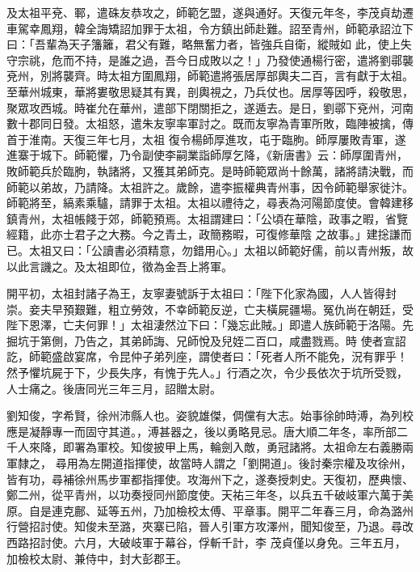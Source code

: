 \begin{pinyinscope}
 及太祖平兗、鄆，遣硃友恭攻之，師範乞盟，遂與通好。天復元年冬，李茂貞劫遷車駕幸鳳翔，韓全誨矯詔加罪于太祖，令方鎮出師赴難。詔至青州，師範承詔泣下曰：「吾輩為天子籓籬，君父有難，略無奮力者，皆強兵自衛，縱賊如
 此，使上失守宗祧，危而不持，是誰之過，吾今日成敗以之！」乃發使通楊行密，遣將劉鄩襲兗州，別將襲齊。時太祖方圍鳳翔，師範遣將張居厚部輿夫二百，言有獻于太祖。至華州城東，華將婁敬思疑其有異，剖輿視之，乃兵仗也。居厚等因呼，殺敬思，聚眾攻西城。時崔允在華州，遣部下閉關拒之，遂遁去。是日，劉鄩下兗州，河南數十郡同日發。太祖怒，遣朱友寧率軍討之。既而友寧為青軍所敗，臨陣被擒，傳首于淮南。天復三年七月，太祖
 復令楊師厚進攻，屯于臨朐。師厚屢敗青軍，遂進寨于城下。師範懼，乃令副使李嗣業詣師厚乞降，《新唐書》云：師厚圍青州，敗師範兵於臨朐，執諸將，又獲其弟師克。是時師範眾尚十餘萬，諸將請決戰，而師範以弟故，乃請降。太祖許之。歲餘，遣李振權典青州事，因令師範舉家徙汴。師範將至，縞素乘驢，請罪于太祖。太祖以禮待之，尋表為河陽節度使。會韓建移鎮青州，太祖帳餞于郊，師範預焉。太祖謂建曰：「公頃在華陰，政事之暇，省覽經籍，此亦士君子之大務。今之青土，政簡務暇，可復修華陰
 之故事。」建捴謙而已。太祖又曰：「公讀書必須精意，勿錯用心。」太祖以師範好儒，前以青州叛，故以此言譏之。及太祖即位，徵為金吾上將軍。



 開平初，太祖封諸子為王，友寧妻號訴于太祖曰：「陛下化家為國，人人皆得封崇。妾夫早預艱難，粗立勞效，不幸師範反逆，亡夫橫屍疆場。冤仇尚在朝廷，受陛下恩澤，亡夫何罪！」太祖淒然泣下曰：「幾忘此賊。」即遣人族師範于洛陽。先掘坑于第側，乃告之，其弟師誨、兄師悅及兒姪二百口，咸盡戮焉。時
 使者宣詔訖，師範盛啟宴席，令昆仲子弟列座，謂使者曰：「死者人所不能免，況有罪乎！然予懼坑屍于下，少長失序，有愧于先人。」行酒之次，令少長依次于坑所受戮，人士痛之。後唐同光三年三月，詔贈太尉。



 劉知俊，字希賢，徐州沛縣人也。姿貌雄傑，倜儻有大志。始事徐帥時溥，為列校應是凝靜專一而固守其道。，溥甚器之，後以勇略見忌。唐大順二年冬，率所部二千人來降，即署為軍校。知俊披甲上馬，輪劍入敵，勇冠諸將。太祖命左右義勝兩軍隸之，
 尋用為左開道指揮使，故當時人謂之「劉開道」。後討秦宗權及攻徐州，皆有功，尋補徐州馬步軍都指揮使。攻海州下之，遂奏授刺史。天復初，歷典懷、鄭二州，從平青州，以功奏授同州節度使。天祐三年冬，以兵五千破岐軍六萬于美原。自是連克鄜、延等五州，乃加檢校太傅、平章事。開平二年春三月，命為潞州行營招討使。知俊未至潞，夾寨已陷，晉人引軍方攻澤州，聞知俊至，乃退。尋改西路招討使。六月，大破岐軍于幕谷，俘斬千計，李
 茂貞僅以身免。三年五月，加檢校太尉、兼侍中，封大彭郡王。




\end{pinyinscope}
